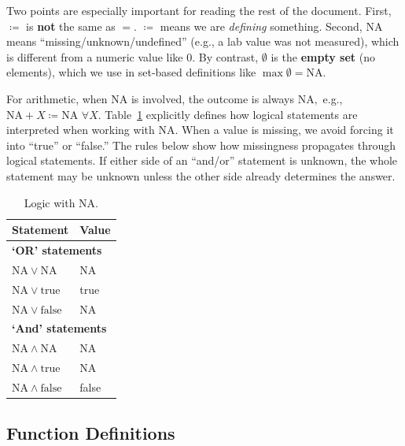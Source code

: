 \documentclass[letterpaper,10pt]{article}
\begin{document}
Two points are especially important for reading the rest of the
document. First, $\coloneqq$ is \textbf{not} the same as $=$. $\coloneqq$ means
we are \emph{defining} something. Second, $\mathrm{NA}$ means
``missing/unknown/undefined'' (e.g., a lab value was not measured),
which is different from a numeric value like 0. By contrast,
$\emptyset$ is the \textbf{empty set} (no elements), which we use in
set-based definitions like $\max \emptyset = \mathrm{NA}$.

For arithmetic, when $\mathrm{NA}$ is involved, the outcome is
always $\mathrm{NA},$ e.g., $\mathrm{NA} + X \coloneqq \mathrm{NA}$ $\forall X.$
Table~\ref{tab:logic-with-na} explicitly defines how logical statements are
interpreted when
working with $\mathrm{NA}$.
When a value is missing, we avoid forcing it into ``true'' or ``false.''
The rules below show how missingness propagates through logical
statements. If either side of an ``and/or'' statement is unknown, the
whole statement may be unknown unless the other side already determines
the answer.

\begin{table}
  \centering
  \caption{Logic with $\mathrm{NA}$.}
  \label{tab:logic-with-na}
  \begin{tabular}{ll}
    \toprule
    Statement & Value \\
    \midrule
    \multicolumn{2}{l}{\textbf{`OR' statements}} \\
      \rowcolor{gray!20}
      $\mathrm{NA} \vee \mathrm{NA}$ & $\mathrm{NA}$ \\
      $\mathrm{NA} \vee \text{true}$ & true \\
      \rowcolor{gray!20}
      $\mathrm{NA} \vee \text{false}$ & $\mathrm{NA}$ \\
    \multicolumn{2}{l}{\textbf{`And' statements}} \\
      \rowcolor{gray!20}
      $\mathrm{NA} \wedge \mathrm{NA}$ & $\mathrm{NA}$ \\
      $\mathrm{NA} \wedge \text{true}$ & $\mathrm{NA}$ \\
      \rowcolor{gray!20}
      $\mathrm{NA} \wedge \text{false}$ & false \\
    \bottomrule
  \end{tabular}
\end{table}

\subsection{Function Definitions}\label{sec:function-definitions}
\end{document}
